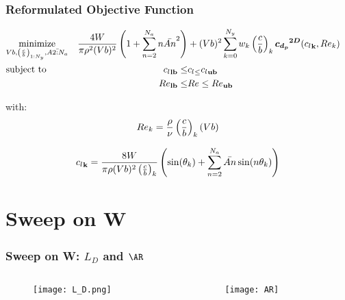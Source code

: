 \documentclass[aspectratio=169,xcolor={dvipsnames}]{beamer}
\begin{document}
\begin{frame}
	 \frametitle{Reformulated Objective Function}


   \begin{align*}
	& \underset{Vb, \left( \frac c b \right)_{1:N_y}, \bar{A{2:N_a}}}{\text{minimize}}  &
	\frac{4W}{\pi \rho^2 (Vb)^2} \left(1+\sum_{n=2}^{N_a} n \bar{A{n}}^2\right) &+
(Vb)^2 \sum_{k=0}^{N_y} w_k \left( \frac c b \right)_{k} \boldsymbol{{c_{d_p}}^{2D}}({c_l}_{\bf k}, Re_k) & \\
	& \text{subject to} & {c_l}_{\bf lb} \leq &{c_l}_{\bf \leq} {c_l}_{\bf ub} \\
	& & {Re}_{\bf lb} \leq &{Re} \leq {Re}_{\bf ub} 
\end{align*}

with:
$$Re_{k} = \frac{\rho}{\nu}\left( \frac c b \right)_{k}(Vb) $$

$$
	{c_l}_{\bf k} = \frac{8W}{\pi \rho (Vb)^2\left( \frac c b \right)_{k}} \left(\sin(\theta_k) + \sum_{n=2}^{N_a} \bar{A{n}} \sin(n \theta_k)\right)
$$
\end{frame}


\section{Sweep on W}
\begin{frame}
	 \frametitle{Sweep on W: $L_D$ and $\AR$}
	 \begin{columns} 
 
		  \begin{column}{0.5\textwidth}
			\begin{figure}
				\texttt{[image: L\_D.png]}
				\raggedleft
		   \end{figure}
		  \end{column}

		  \begin{column}{0.5\textwidth}
			   \begin{figure}
					\texttt{[image: AR]}
					\raggedright
			   \end{figure}
		  \end{column}

	 \end{columns}
\end{frame}
\end{document}
